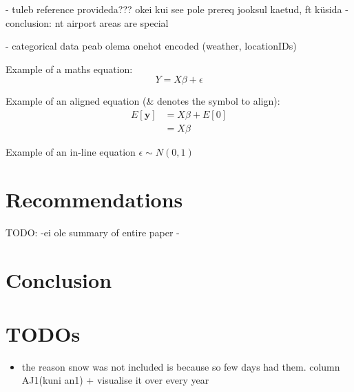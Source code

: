 \documentclass[11pt]{article}
\begin{document}
    - tuleb reference provideda??? okei kui see pole prereq jooksul kaetud, ft küsida
    - conclusion: nt airport areas are special

- categorical data peab olema onehot encoded (weather, locationIDs)

Example of a maths equation:
\begin{equation}
    Y = X\beta + \epsilon
\end{equation}

Example of an aligned equation (\& denotes the symbol to align):
\begin{align*}
    E[\mathbf{y}] &= X\beta + E[0] \\
                  &= X\beta
\end{align*}

Example of an in-line equation $\epsilon \sim N(0, 1)$

\section{Recommendations}
TODO: 
    -ei ole summary of entire paper
    - 


\section{Conclusion}


\section{TODOs}
\begin{itemize} 
    \item the reason snow was not included is because so few days had them. column AJ1(kuni an1) + visualise it over every year
\end{itemize} 


\clearpage

\printbibliography
\end{document}

